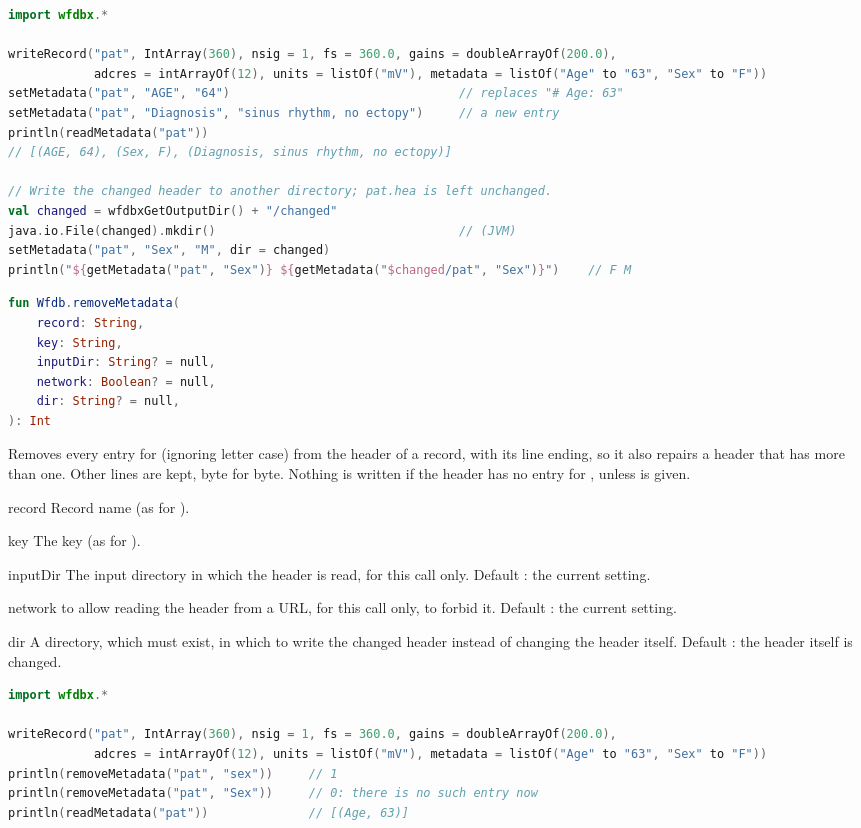\begin{lstlisting}[language=Kotlin,style=example]
import wfdbx.*

writeRecord("pat", IntArray(360), nsig = 1, fs = 360.0, gains = doubleArrayOf(200.0),
            adcres = intArrayOf(12), units = listOf("mV"), metadata = listOf("Age" to "63", "Sex" to "F"))
setMetadata("pat", "AGE", "64")                                // replaces "# Age: 63"
setMetadata("pat", "Diagnosis", "sinus rhythm, no ectopy")     // a new entry
println(readMetadata("pat"))
// [(AGE, 64), (Sex, F), (Diagnosis, sinus rhythm, no ectopy)]

// Write the changed header to another directory; pat.hea is left unchanged.
val changed = wfdbxGetOutputDir() + "/changed"
java.io.File(changed).mkdir()                                  // (JVM)
setMetadata("pat", "Sex", "M", dir = changed)
println("${getMetadata("pat", "Sex")} ${getMetadata("$changed/pat", "Sex")}")    // F M
\end{lstlisting}

\begin{lstlisting}[language=Kotlin,style=signature]
fun Wfdb.removeMetadata(
    record: String,
    key: String,
    inputDir: String? = null,
    network: Boolean? = null,
    dir: String? = null,
): Int
\end{lstlisting}
Removes every entry for  (ignoring letter case) from the header of a record,
with its line ending, so it also repairs a header that has more than one. Other lines are
kept, byte for byte. Nothing is written if the header has no entry for , unless
 is given.
\begin{params}
\item[record] Record name (as for ).
\item[key] The key (as for ).
\item[inputDir] The input directory in which the header is read, for this call only.
  Default : the current setting.
\item[network]  to allow reading the header from a URL, for this call only,
   to forbid it. Default : the current setting.
\item[dir] A directory, which must exist, in which to write the changed header instead of
  changing the header itself. Default : the header itself is changed.
\end{params}
\begin{lstlisting}[language=Kotlin,style=example]
import wfdbx.*

writeRecord("pat", IntArray(360), nsig = 1, fs = 360.0, gains = doubleArrayOf(200.0),
            adcres = intArrayOf(12), units = listOf("mV"), metadata = listOf("Age" to "63", "Sex" to "F"))
println(removeMetadata("pat", "sex"))     // 1
println(removeMetadata("pat", "Sex"))     // 0: there is no such entry now
println(readMetadata("pat"))              // [(Age, 63)]
\end{lstlisting}

